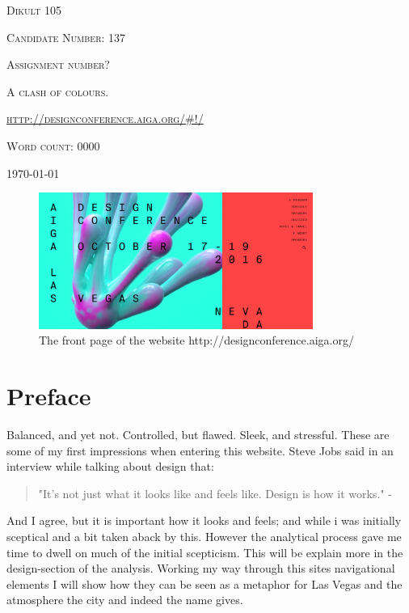\documentclass{article}
\begin{document}
	\begin{titlepage} 
		\centering
		{\scshape\Large Dikult 105\par}
		\vspace{2em}
		{\scshape\large Candidate Number: 137\par}
		\vspace{6em}
		{\scshape\Large Assignment number?\par}
		{\scshape\LARGE A clash of colours.\par}
		\vspace{1em}
		{\scshape\url{http://designconference.aiga.org/#!/}\par}
		\vfill
		{\scshape Word count: 0000\par}
		\vspace{3em}
		\large\today
	\end{titlepage}

    \begin{figure}[h!]
        \centering
        \includegraphics[width=0.8\textwidth]{frontPage}
        \caption{The front page of the website http://designconference.aiga.org/}
    \end{figure}
    \vspace{5em}
	\section{Preface}
	    Balanced, and yet not. Controlled, but flawed. Sleek, and stressful. These are some of my first impressions when entering this website. Steve Jobs said in an interview while talking about design that:
        \begin{quotation}
           "It's not just what it looks like and feels like. Design is how it works." - \citep{SteveJobsQuote}
           
        \end{quotation} And I agree, but it is important how it looks and feels; and while i was initially sceptical and a bit taken aback by this. However the analytical process gave me time to dwell on much of the initial scepticism. This will be explain more in the design-section of the analysis. Working my way through this sites navigational elements I will show how they can be seen as a metaphor for Las Vegas and the atmosphere the city and indeed the name gives.
\end{document}
